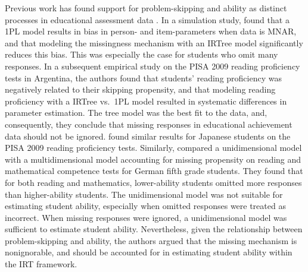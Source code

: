 \documentclass{edm_article}
\begin{document}
Previous work has found support for problem-skipping and ability as distinct processes in educational assessment data \cite{okumura2014empirical, pohl2014dealing, debeer2017modeling, huang2020mixture, holman2005modelling}. In a simulation study, \citet{debeer2017modeling} found that a 1PL model results in bias in person- and item-parameters when data is MNAR, and that modeling the missingness mechanism with an IRTree model significantly reduces this bias. This was especially the case for students who omit many responses. In a subsequent empirical study on the PISA 2009 reading proficiency tests in Argentina, the authors found that students' reading proficiency was negatively related to their skipping propensity, and that modeling reading proficiency with a IRTree vs.\ 1PL model resulted in systematic differences in parameter estimation. The tree model was the best fit to the data, and, consequently, they conclude that missing responses in educational achievement data should not be ignored. \citet{okumura2014empirical} found similar results for Japanese students on the PISA 2009 reading proficiency tests. Similarly, \citet{pohl2014dealing} compared a unidimensional model with a multidimensional model accounting for missing propensity on reading and mathematical competence tests for German fifth grade students. They found that for both reading and mathematics, lower-ability students omitted more responses than higher-ability students. The unidimensional model was not suitable for estimating student ability, especially when omitted responses were treated as incorrect. When missing responses were ignored, a unidimensional model was sufficient to estimate student ability. Nevertheless, given the relationship between problem-skipping and ability, the authors argued that the missing mechanism is nonignorable, and should be accounted for in estimating student ability within the IRT framework. 

\end{document}
